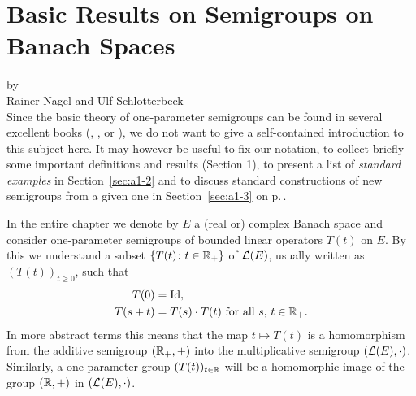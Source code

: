 \chapter{Basic Results on Semigroups on Banach Spaces}\label{chap:a1}%
{\Large
\vspace*{-.75cm}
by \\[.25em]
Rainer Nagel and Ulf Schlotterbeck 
\vspace{.75cm}
\\
}
Since the basic theory of one-parameter semigroups can be found in several excellent books (\eg \citet{davies:1980}, \citet{goldstein:1985a}, \citet{pazy:1983} or \citet{hillephillips:1957}), we do not want to give a self-contained introduction to this subject here.
It may however be useful to fix our notation, to collect briefly some important definitions and results (Section 1), to present a list of \emph{standard examples} in Section~\ref{sec:a1-2} %
and to discuss standard constructions of new semigroups from a given one in Section~\ref{sec:a1-3} on p.\,\pageref{sec:a1-3}. %

In the entire chapter we denote by $E$ a (real or) complex Banach space and consider one-parameter semigroups of bounded linear operators $T(t)$ on $E$.
By this we understand a subset $\{T(t) \colon  t \in \mathbb{R}_{+}\}$ of $\mathcal{L}(E)$, usually written as $(T(t))_{t\geq0}$, such that
\begin{align*}
	T(0) &= \operatorname{Id}, \\
	T(s+t) &= T(s) \cdot T(t) \text{ for all $s$, $t \in \mathbb{R}_{+}$.}
\end{align*}
In more abstract terms this means that the map $t \mapsto T(t)$ is a homomorphism from the additive semigroup $(\mathbb{R}_{+},+)$ into the multiplicative semigroup $(\mathcal{L}(E),\cdot)$.
Similarly, a one-parameter group $(T(t))_{t\in\mathbb{R}}$ will be a homomorphic image of the group $(\mathbb{R},+)$ in $(\mathcal{L}(E),\cdot)$.
